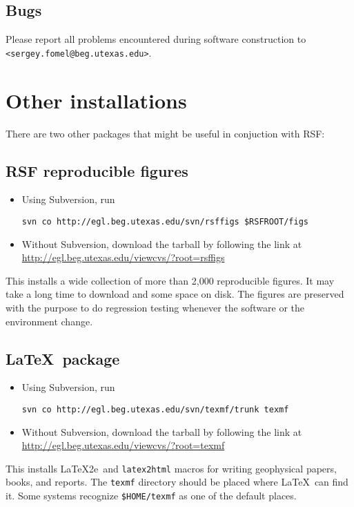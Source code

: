 \subsection{Bugs}

Please report all problems encountered during software construction to \\
\texttt{<sergey.fomel@beg.utexas.edu>}.

\section{Other installations}

There are two other packages that might be useful in conjuction with RSF:

\subsection{RSF reproducible figures}

\begin{itemize}
\item Using Subversion, run
\begin{verbatim}
svn co http://egl.beg.utexas.edu/svn/rsffigs $RSFROOT/figs
\end{verbatim}
\item Without Subversion, download the tarball by following the link at
\url{http://egl.beg.utexas.edu/viewcvs/?root=rsffigs}
\end{itemize}
This installs a wide collection of more than 2,000 reproducible
figures. It may take a long time to download and some space on disk.
The figures are preserved with the purpose to do regression testing
whenever the software or the environment change.

\subsection{\LaTeX\ package}

\begin{itemize}
\item Using Subversion, run
\begin{verbatim}
svn co http://egl.beg.utexas.edu/svn/texmf/trunk texmf
\end{verbatim}
\item Without Subversion, download the tarball by following the link at
  \url{http://egl.beg.utexas.edu/viewcvs/?root=texmf}
\end{itemize}
This installs \LaTeX2e\ and \texttt{latex2html} macros for writing
geophysical papers, books, and reports. The \texttt{texmf} directory should
be placed where \LaTeX\ can find it. Some systems recognize
\texttt{\$HOME/texmf} as one of the default places.

%

